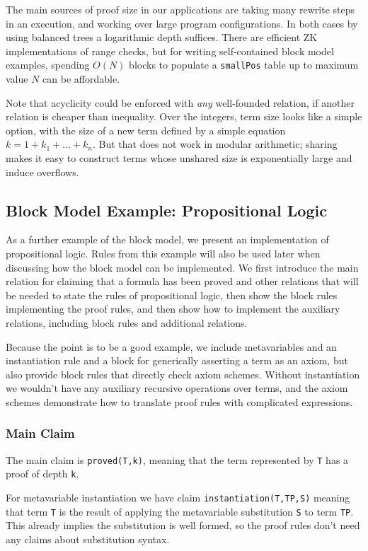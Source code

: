 \documentclass{article}
\theoremstyle{plain}
\theoremstyle{definition}
\begin{document}
The main sources of proof size in our applications are taking many
rewrite steps in an execution, and working over large program
configurations. In both cases by using balanced trees a logarithmic
depth suffices.
There are efficient ZK implementations of range checks, but
for writing self-contained block model examples,
spending $O(N)$ blocks to populate a \texttt{smallPos} table up to maximum
value $N$ can be affordable.

Note that acyclicity could be enforced with \emph{any} well-founded
relation, if another relation is cheaper than inequality.
Over the integers, term size looks like a simple option, with the size
of a new term defined by a simple equation $k = 1 + k_1 + \ldots + k_n$.
But that does not work in modular arithmetic; sharing makes it easy to
construct terms whose unshared size is exponentially large and induce
overflows.
\subsection{Block Model Example: Propositional Logic}\label{block-model-example-propositional-logic}

As a further example of the block model, we present an implementation of propositional logic.
Rules from this example will also be used later when discussing how the block model can be implemented.
We first introduce the main relation for claiming that a formula
has been proved and other relations that will be needed to state
the rules of propositional logic, then show the block rules
implementing the proof rules, and then show how to implement
the auxiliary relations, including block rules and additional
relations.

Because the point is to be a good example, we include metavariables and
an instantiation rule and a block for generically asserting a term
as an axiom, but also provide block rules that directly check axiom
schemes. Without instantiation we wouldn't have any auxiliary recursive
operations over terms, and the axiom schemes demonstrate how to
translate proof rules with complicated expressions.

\subsubsection{Main Claim}\label{main-claim}

The main claim is \texttt{proved(T,k)}, meaning that the term
represented by \texttt{T} has a proof of depth \texttt{k}.

For metavariable instantiation we have claim
\texttt{instantiation(T,TP,S)} meaning that term \texttt{T} is the
result of applying the metavariable substitution \texttt{S} to term
\texttt{TP}. This already implies the substitution is well formed, so
the proof rules don't need any claims about substitution syntax.
\end{document}
